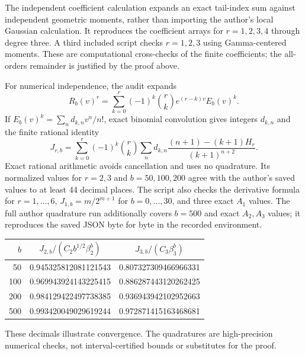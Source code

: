 \documentclass[11pt,letterpaper]{article}
\theoremstyle{remark}\newtheorem{remark}[theorem]{Remark}
\begin{document}
The independent coefficient calculation expands an exact tail-index sum against independent geometric moments, rather than importing the author's local Gaussian calculation. It reproduces the coefficient arrays for $r=1,2,3,4$ through degree three. A third included script checks $r=1,2,3$ using Gamma-centered moments. These are computational cross-checks of the finite coefficients; the all-orders remainder is justified by the proof above.

For numerical independence, the audit expands
\[
 R_b(v)^r=\sum_{k=0}^r(-1)^k\binom rk e^{(r-k)v}E_b(v)^k.
\]
If $E_b(v)^k=\sum_n d_{k,n}v^n/n!$, exact binomial convolution gives integers $d_{k,n}$ and the finite rational identity
\begin{equation}\label{amc:sec:eq:rational}
 J_{r,b}=\sum_{k=0}^r(-1)^k\binom rk\sum_n
 d_{k,n}\frac{(n+1)-(k+1)H_r}{(k+1)^{n+2}}.
\end{equation}
Exact rational arithmetic avoids cancellation and uses no quadrature. Its normalized values for $r=2,3$ and $b=50,100,200$ agree with the author's saved values to at least 44 decimal places. The script also checks the derivative formula for $r=1,\ldots,6$, $J_{1,b}=m/2^{m+1}$ for $b=0,\ldots,30$, and three exact $A_1$ values. The full author quadrature run additionally covers $b=500$ and exact $A_2,A_3$ values; it reproduces the saved JSON byte for byte in the recorded environment.

\begin{center}
\begin{tabular}{rcc}
\toprule
$b$ & $J_{2,b}/(C_2 b^{1/2}\beta_2^b)$ & $J_{3,b}/(C_3\beta_3^b)$\\
\midrule
50  & 0.945325812081121543 & 0.807327309466966331\\
100 & 0.969943924143225415 & 0.886287443120262425\\
200 & 0.984129422497738385 & 0.936943942102952663\\
500 & 0.993420049029619244 & 0.972871415163468681\\
\bottomrule
\end{tabular}
\end{center}
These decimals illustrate convergence. The quadratures are high-precision numerical checks, not interval-certified bounds or substitutes for the proof.
\end{document}
